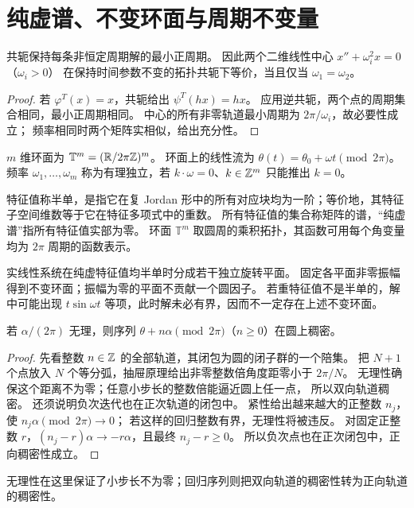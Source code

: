 \section{纯虚谱、不变环面与周期不变量}
\begin{proposition}
共轭保持每条非恒定周期解的最小正周期。
因此两个二维线性中心 $x''+\omega_i^2x=0$（$\omega_i>0$）
在保持时间参数不变的拓扑共轭下等价，当且仅当 $\omega_1=\omega_2$。
\end{proposition}
\begin{proof}
若 $\varphi^T(x)=x$，共轭给出 $\psi^T(hx)=hx$。
应用逆共轭，两个点的周期集合相同，最小正周期相同。
中心的所有非零轨道最小周期为 $2\pi/\omega_i$，故必要性成立；
频率相同时两个矩阵实相似，给出充分性。
\end{proof}
\begin{definition}
$m$ 维环面为 $\mathbb T^m=(\mathbb{R}/2\pi\mathbb{Z})^m$。
环面上的线性流为 $\theta(t)=\theta_0+\omega t\pmod{2\pi}$。
频率 $\omega_1,\ldots,\omega_m$ 称为有理独立，若
$k\cdot\omega=0$、$k\in\mathbb{Z}^m$ 只能推出 $k=0$。
\end{definition}

\begin{definition}[半单特征值]
特征值称半单，是指它在复 Jordan 形中的所有对应块均为一阶；等价地，其特征子空间维数等于它在特征多项式中的重数。
所有特征值的集合称矩阵的谱，“纯虚谱”指所有特征值实部为零。
环面 $\mathbb T^m$ 取圆周的乘积拓扑，其函数可用每个角变量均为 $2\pi$ 周期的函数表示。
\end{definition}

实线性系统在纯虚特征值均半单时分成若干独立旋转平面。
固定各平面非零振幅得到不变环面；振幅为零的平面不贡献一个圆因子。
若重特征值不是半单的，解中可能出现 $t\sin\omega t$ 等项，此时解未必有界，因而不一定存在上述不变环面。

\begin{lemma}[无理旋转]
若 $\alpha/(2\pi)$ 无理，则序列 $\theta+n\alpha\pmod{2\pi}$（$n\geq0$）在圆上稠密。
\end{lemma}
\begin{proof}
先看整数 $n\in\mathbb{Z}$ 的全部轨道，其闭包为圆的闭子群的一个陪集。
把 $N+1$ 个点放入 $N$ 个等分弧，抽屉原理给出非零整数倍角度距零小于 $2\pi/N$。
无理性确保这个距离不为零；任意小步长的整数倍能逼近圆上任一点，
所以双向轨道稠密。
还须说明负次迭代也在正次轨道的闭包中。
紧性给出越来越大的正整数 $n_j$，使 $n_j\alpha\pmod{2\pi}\to0$；
若这样的回归整数有界，无理性将被违反。
对固定正整数 $r$，$(n_j-r)\alpha\to-r\alpha$，且最终 $n_j-r\geq0$。
所以负次点也在正次闭包中，正向稠密性成立。
\end{proof}
无理性在这里保证了小步长不为零；回归序列则把双向轨道的稠密性转为正向轨道的稠密性。

